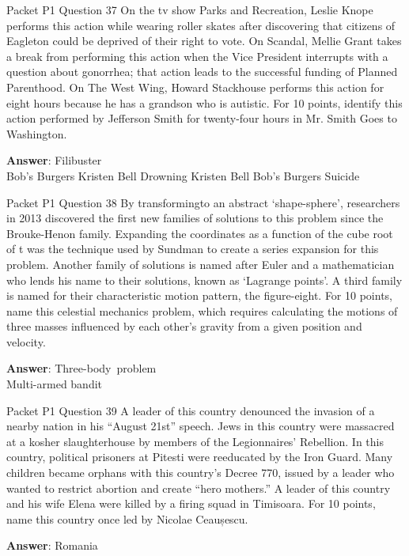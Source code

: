 \begin{frame}{Packet P1 Question 37}
On the tv show Parks and   Recreation, Leslie Knope performs this action while wearing roller skates after discovering that citizens of Eagleton could be deprived of   their right to vote. On Scandal, Mellie Grant takes a break from performing this action when the Vice President interrupts with a question about gonorrhea; that action leads to the successful funding of Planned Parenthood. On The West Wing, Howard Stackhouse performs this action for eight hours because he has a grandson who is autistic. For 10 points, identify this action performed by Jefferson Smith for twenty-four hours in Mr. Smith Goes to Washington.        

\textbf{Answer}: Filibuster\\
 Bob's Burgers
 Kristen Bell
 Drowning
 Kristen Bell
 Bob's Burgers
 Suicide
\end{frame}

\begin{frame}{Packet P1 Question 38}
By transformingto an abstract `shape-sphere', researchers in 2013 discovered the first new families of solutions to this problem since the Brouke-Henon family.  Expanding the coordinates as a function of the cube root of t was the technique used by Sundman to create   a series expansion for this problem.  Another family of   solutions is named after Euler and a mathematician who lends his name to their solutions, known as `Lagrange points'. A   third family is named for their characteristic motion pattern, the figure-eight. For 10 points, name this celestial mechanics problem, which requires calculating the motions of three masses influenced by each other's gravity from a given position and velocity.  

\textbf{Answer}: Three-body\ problem\\
 Multi-armed bandit
\end{frame}

\begin{frame}{Packet P1 Question 39}
A leader of this country denounced the invasion of a nearby nation in his ``August 21st'' speech. Jews in this country were massacred at a kosher slaughterhouse by members of the Legionnaires’ Rebellion. In this country, political prisoners at Pitesti were reeducated by the Iron Guard. Many children became   orphans with this country's Decree 770, issued by a leader who wanted to restrict abortion and create   “hero mothers.” A leader of this country and his wife Elena were killed by     a firing squad in Timisoara. For 10 points, name this country once led by Nicolae Ceaușescu.

\textbf{Answer}: Romania\\
\end{frame}

